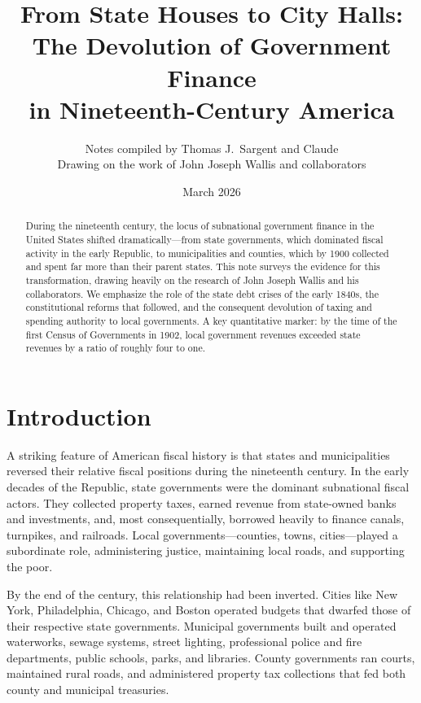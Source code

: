 \documentclass[12pt]{article}
\title{From State Houses to City Halls:\\
The Devolution of Government Finance\\
in Nineteenth-Century America}
\author{Notes compiled by Thomas J.\ Sargent and Claude\\[6pt]
\small Drawing on the work of John Joseph Wallis and collaborators}
\date{March 2026}
\begin{document}
\maketitle

\begin{abstract}
During the nineteenth century, the locus of subnational government finance in the United States shifted dramatically---from state governments, which dominated fiscal activity in the early Republic, to municipalities and counties, which by 1900 collected and spent far more than their parent states.   This note surveys the evidence for this transformation, drawing heavily on the research of John Joseph Wallis and his collaborators.  We emphasize the role of the state debt crises of the early 1840s, the constitutional reforms that followed, and the consequent devolution of taxing and spending authority to local governments.
A key quantitative marker: by the time of the first Census of Governments in 1902, local government revenues exceeded state revenues by a ratio of roughly four to one.
\end{abstract}

\tableofcontents

\newpage

\section{Introduction}

A striking feature of American fiscal history is that  states and municipalities reversed their relative fiscal  positions  during the nineteenth century.  In the early decades of the Republic, state governments were the dominant subnational fiscal actors.  They collected property taxes, earned revenue from state-owned banks and investments, and, most consequentially, borrowed heavily to finance canals, turnpikes, and railroads.  Local governments---counties, towns, cities---played a subordinate role, administering justice, maintaining local roads, and supporting the poor.

By the end of the century, this relationship had been inverted.  Cities like New York, Philadelphia, Chicago, and Boston operated budgets that dwarfed those of their respective state governments.  Municipal governments built and operated waterworks, sewage systems, street lighting, professional police and fire departments, public schools, parks, and libraries.  County governments ran courts, maintained rural roads, and administered property tax collections that fed both county and municipal treasuries.
\end{document}
